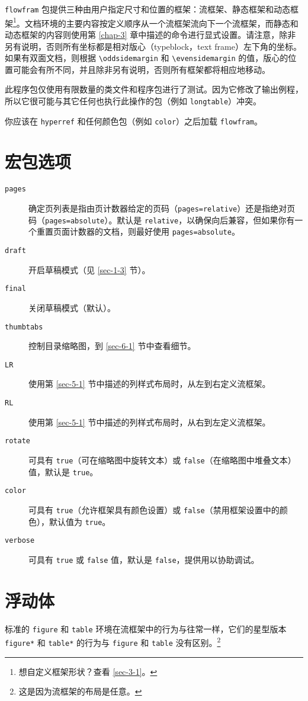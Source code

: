 \documentclass[a4paper]{book}%
\newcommand{\sty}[1]{\texttt{#1}}
\newcommand{\cmd}[1]{\texttt{#1}}
\begin{document}
\sty{flowfram} 包提供三种由用户指定尺寸和位置的框架：流框架、静态框架和动态框架\footnote{想自定义框架形状？查看 \ref{sec-3-1}。}。文档环境的主要内容按定义顺序从一个流框架流向下一个流框架，而静态和动态框架的内容则使用第 \ref{chap-3} 章中描述的命令进行显式设置。请注意，除非另有说明，否则所有坐标都是相对版心（typeblock，text frame）左下角的坐标。如果有双面文档，则根据 \verb|\oddsidemargin| 和 \verb|\evensidemargin| 的值，版心的位置可能会有所不同，并且除非另有说明，否则所有框架都将相应地移动。

此程序包仅使用有限数量的类文件和程序包进行了测试。因为它修改了输出例程，所以它很可能与其它任何也执行此操作的包（例如 \sty{longtable}）冲突。

你应该在 \sty{hyperref} 和任何颜色包（例如 \sty{color}）之后加载 \sty{flowfram}。

\section{宏包选项}%
\begin{description}
    \item[\cmd{pages}] 确定页列表是指由页计数器给定的页码（\cmd{pages=relative}）还是指绝对页码（\cmd{pages=absolute}）。默认是 \cmd{relative}，以确保向后兼容，但如果你有一个重置页面计数器的文档，则最好使用 \cmd{pages=absolute}。
    \item[\cmd{draft}] 开启草稿模式（见 \ref{sec-1-3} 节）。
    \item[\cmd{final}] 关闭草稿模式（默认）。
    \item[\cmd{thumbtabs}] 控制目录缩略图，到 \ref{sec-6-1} 节中查看细节。
    \item[\cmd{LR}] 使用第 \ref{sec-5-1} 节中描述的列样式布局时，从左到右定义流框架。
    \item[\cmd{RL}] 使用第 \ref{sec-5-1} 节中描述的列样式布局时，从右到左定义流框架。
    \item[\cmd{rotate}] 可具有 \cmd{true}（可在缩略图中旋转文本）或 \cmd{false}（在缩略图中堆叠文本）值，默认是 \cmd{true}。
    \item[\cmd{color}] 可具有 \cmd{true}（允许框架具有颜色设置）或 \cmd{false}（禁用框架设置中的颜色），默认值为 \cmd{true}。
    \item[\cmd{verbose}] 可具有 \cmd{true} 或 \cmd{false} 值，默认是 \cmd{false}，提供用以协助调试。
\end{description}
\section{浮动体}%
标准的 \cmd{figure} 和 \cmd{table} 环境在流框架中的行为与往常一样，它们的星型版本 \cmd{figure*} 和 \cmd{table*} 的行为与 \cmd{figure} 和 \cmd{table} 没有区别。\footnote{这是因为流框架的布局是任意。}
\end{document}
